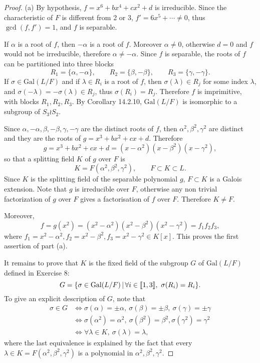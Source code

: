 \documentclass[11pt,a4paper]{article}
\def\gcro{\mbox{[\hspace{-.15em}[}}%
\def\dcro{\mbox{]\hspace{-.15em}]}}
\newcommand{\Gal}{\mathrm{Gal}}
\begin{document}
\begin{proof}

\item[(a)] By hypothesis, $f = x^6 + bx^4+cx^2 +d$ is irreducible. Since the characteristic of $F$ is different from 2 or 3, $f' = 6x^5+\cdots \ne 0$, thus $\gcd(f,f') =1$, and $f$ is separable.

If $\alpha$ is a root of $f$, then $-\alpha$ is a root of $f$. Moreover $\alpha \ne 0$, otherwise $d= 0$ and $f$ would not be irreducible, therefore $\alpha \ne -\alpha$. Since $f$ is separable, the roots of $f$ can be partitioned into three blocks
$$R_1 = \{\alpha,-\alpha\},\qquad R_2 = \{\beta,-\beta\},\qquad R_3 = \{\gamma, -\gamma\}.$$
If $\sigma \in \Gal(L/F)$ and if $\lambda \in R_i$ is a root of $f$, then $\sigma(\lambda) \in R_j$ for some index $\lambda$, and $\sigma(-\lambda) = - \sigma(\lambda) \in R_j$, thus $\sigma(R_i) = R_j$. Therefore $f$ is imprimitive, with blocks $R_1,R_2,R_3$. By Corollary 14.2.10, $\Gal(L/F)$ is isomorphic to a subgroup of $S_3 \wr S_2$.

Since $\alpha,-\alpha, \beta,-\beta,\gamma,-\gamma$ are the distinct roots of $f$, then $\alpha^2,\beta^2,\gamma^2$ are distinct and they are the roots of $g = x^3 +bx^2+cx+d$. Therefore
$$g =  x^3 +bx^2+cx+d = (x-\alpha^2)(x-\beta^2)(x-\gamma^2),$$
so that a splitting field $K$ of $g$ over $F$ is 
$$K = F(\alpha^2,\beta^2,\gamma^2),\qquad F \subset K \subset L.$$
Since $K$ is the splitting field of the separable polynomial $g$, $F \subset K$ is a Galois extension. Note that $g$ is irreducible over $F$, otherwise any non trivial factorization of $g$ over $F$ gives a factorisation of $f$ over $F$. Therefore $K \ne F$.

Moreover,
$$f = g(x^2) = (x^2-\alpha^2)(x^2-\beta^2)(x^2-\gamma^2) = f_1f_2f_3,$$
where $f_1 = x^2 - \alpha^2, f_2 = x^2 - \beta^2,f_3 = x^2 -\gamma^2 \in K[x]$. This proves the first assertion of part (a).

\bigskip

It remains to prove that $K$ is the fixed field of the subgroup $G$ of $\Gal(L/F)$ defined in Exercise 8:
$$G = \{\sigma \in \Gal(L/F)\, | \, \forall i \in \gcro 1, 3 \dcro, \ \sigma(R_i) = R_i \}.$$
To give an explicit description of $G$, note that
\begin{align*}
\sigma \in G &\iff \sigma(\alpha) = \pm \alpha,\ \sigma(\beta) = \pm \beta, \ \sigma(\gamma) = \pm \gamma\\
&\iff \sigma(\alpha^2) = \alpha^2,\ \sigma(\beta^2) = \beta^2, \sigma(\gamma^2) = \gamma^2\\
&\iff \forall \lambda \in K,\ \sigma(\lambda) = \lambda,
\end{align*}
where the last equivalence is explained by the fact that every $\lambda \in K = F(\alpha^2,\beta^2,\gamma^2)$ is a polynomial in $\alpha^2,\beta^2,\gamma^2$.


\end{proof}
\end{document}
